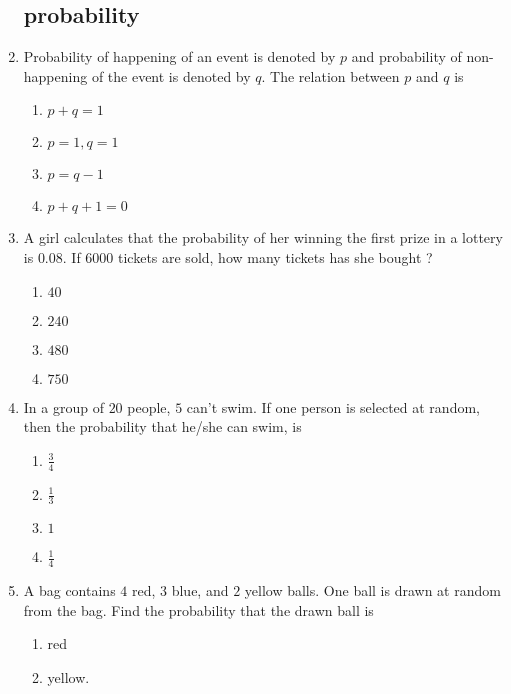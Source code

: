 \documentclass{article}
\begin{document}
\begin{enumerate}
\subsection{probability}
\item  Probability of happening of an event is denoted by $p$ and probability of non-happening of the event is denoted by $q$. The relation between $p$ and $q$ is 
\begin{enumerate}
\item $p + q = 1$
\item $p = 1,q = 1$ 
\item $p = q -1$ 
\item $p +q +1 = 0$ 
\end{enumerate} 
\item A girl calculates that the probability of her winning the first prize in a lottery is $0.08$. If $6000$ tickets are sold, how many tickets has she bought ? 
\begin{enumerate}   
\item $40$ 
\item $240$
\item $480$
\item $750$
\end{enumerate}
\item In a group of $20$ people, $5$ can't swim. If one person is selected at random, then the probability that he/she can swim, is
\begin{enumerate}
\item $\frac{3}{4}$
\item $\frac{1}{3}$
\item $1$
\item $\frac{1}{4}$
\end{enumerate}
\item A bag contains $4$ red, $3$ blue, and $2$ yellow balls. One ball is drawn at random from the bag. Find  the probability that the drawn ball is  
\begin{enumerate}
\item red
\item yellow.
\end{enumerate}

\end{enumerate}
\end{document}
